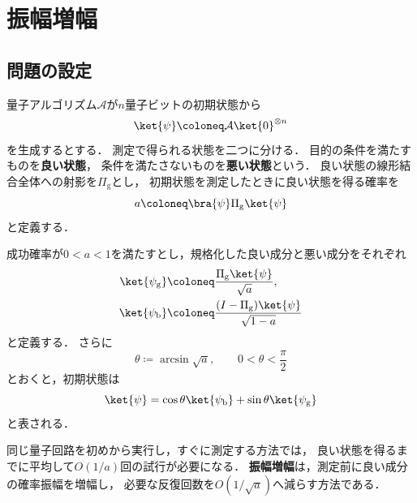 \section{振幅増幅}
\label{sec:amplitude-amplification}

\subsection{問題の設定}
\label{subsec:amplitude-amplification-setting}

量子アルゴリズム$\mathcal{A}$が$n$量子ビットの初期状態から
\begin{equation}
  \ket{\psi}
  \coloneq
  \mathcal{A}\ket{0}^{\otimes n}
  \label{eq:amplitude-amplification-initial-state}
\end{equation}
を生成するとする．
測定で得られる状態を二つに分ける．
目的の条件を満たすものを\textbf{良い状態}，
条件を満たさないものを\textbf{悪い状態}という．
良い状態の線形結合全体への射影を$\Pi_{\mathrm{g}}$とし，
初期状態を測定したときに良い状態を得る確率を
\begin{equation}
  a
  \coloneq
  \bra{\psi}\Pi_{\mathrm{g}}\ket{\psi}
  \label{eq:initial-good-probability}
\end{equation}
と定義する．

成功確率が$0<a<1$を満たすとし，規格化した良い成分と悪い成分をそれぞれ
\begin{align}
  \ket{\psi_{\mathrm{g}}}
  &\coloneq
  \frac{\Pi_{\mathrm{g}}\ket{\psi}}{\sqrt{a}},
  \label{eq:normalized-good-state}\\
  \ket{\psi_{\mathrm{b}}}
  &\coloneq
  \frac{(I-\Pi_{\mathrm{g}})\ket{\psi}}{\sqrt{1-a}}
  \label{eq:normalized-bad-state}
\end{align}
と定義する．
さらに
\begin{equation}
  \theta
  \coloneq
  \arcsin\sqrt{a},
  \qquad
  0<\theta<\frac{\pi}{2}
  \label{eq:amplification-angle}
\end{equation}
とおくと，初期状態は
\begin{equation}
  \ket{\psi}
  =
  \cos\theta\ket{\psi_{\mathrm{b}}}
  +\sin\theta\ket{\psi_{\mathrm{g}}}
  \label{eq:good-bad-decomposition}
\end{equation}
と表される．

同じ量子回路を初めから実行し，すぐに測定する方法では，
良い状態を得るまでに平均して$O(1/a)$回の試行が必要になる．
\textbf{振幅増幅}は，測定前に良い成分の確率振幅を増幅し，
必要な反復回数を$O(1/\sqrt{a})$へ減らす方法である\cite{shimada2020}．

